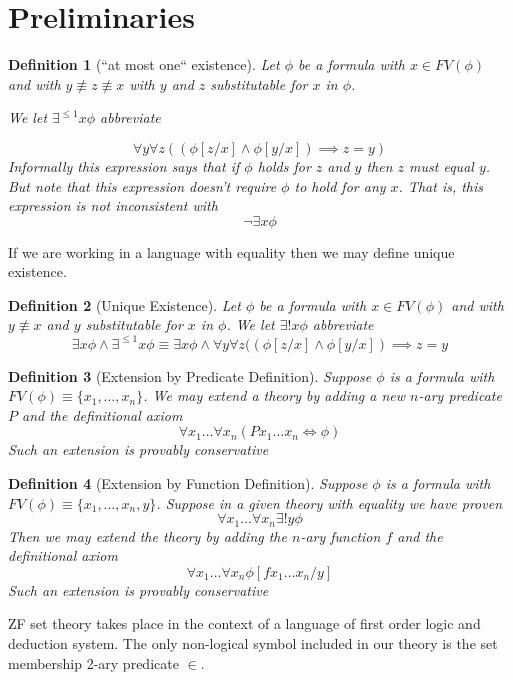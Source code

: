 \documentclass[12pt]{article}
\theoremstyle{break}
\newtheorem{definition}{Definition}[section]
\theoremstyle{break}
\theoremstyle{break}
\theoremstyle{break}
\theoremstyle{break}
\newtheorem{informal definition}[definition]{Informal Definition}
\begin{document}
\section{Preliminaries}

\begin{definition}[``at most one`` existence]
Let $\phi$ be a formula with $x\in FV(\phi)$ and with $y\not\equiv z \not \equiv x$ with $y$ and $z$ substitutable for $x$ in $\phi$.

We let $\exists^{\leqslant 1} x\phi$ abbreviate

$$
\forall y \forall z ((\phi[z/x]\land \phi[y/x]) \implies z=y)
$$
Informally this expression says that if $\phi$ holds for $z$ and $y$ then $z$ must equal $y$.
But note that this expression doesn't require $\phi$ to hold for any $x$.
That is, this expression is not inconsistent with
$$
\lnot\exists x \phi
$$
\end{definition}

If we are working in a language with equality then we may define unique existence.
\begin{definition}[Unique Existence]
Let $\phi$ be a formula with $x\in FV(\phi)$ and with $y\not \equiv x$ and $y$ substitutable for $x$ in $\phi$.
We let $\exists ! x \phi$ abbreviate
$$
\exists x \phi \land \exists^{\leqslant 1} x \phi\equiv \exists x \phi \land \forall y \forall z ((\phi[z/x]\land\phi[y/x])\implies z=y
$$
\end{definition}

\begin{definition}[Extension by Predicate Definition]
Suppose $\phi$ is a formula with $FV(\phi) \equiv \{x_1,\ldots, x_n\}$.
We may extend a theory by adding a new $n$-ary predicate $P$ and the definitional axiom
$$
\forall x_1 \ldots \forall x_n (Px_1\ldots x_n \iff \phi)
$$
Such an extension is provably conservative
\end{definition}

\begin{definition}[Extension by Function Definition]
Suppose $\phi$ is a formula with $FV(\phi)\equiv \{x_1,\ldots, x_n, y\}$.
Suppose in a given theory with equality we have proven
$$
\forall x_1 \ldots \forall x_n \exists! y \phi
$$
Then we may extend the theory by adding the $n$-ary function $f$ and the definitional axiom
$$
\forall x_1 \ldots \forall x_n \phi[fx_1\ldots x_n/y]
$$
Such an extension is provably conservative
\end{definition}

ZF set theory takes place in the context of a language of first order logic and deduction system.
The only non-logical symbol included in our theory is the set membership 2-ary predicate $\in$.
\end{document}
